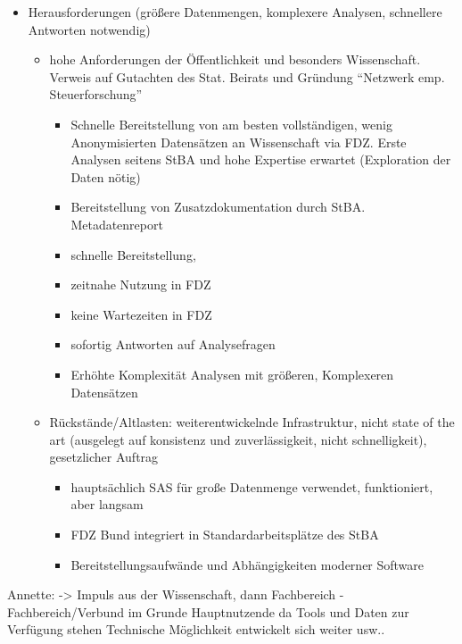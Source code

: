 \documentclass[
  german,
  10pt,
  twoside]{article}
\providecommand{\tightlist}{%
  \setlength{\itemsep}{0pt}\setlength{\parskip}{0pt}}
\begin{document}
\begin{itemize}
\item
  Herausforderungen (größere Datenmengen, komplexere Analysen,
  schnellere Antworten notwendig)

  \begin{itemize}
  \tightlist
  \item
    hohe Anforderungen der Öffentlichkeit und besonders Wissenschaft.
    Verweis auf Gutachten des Stat. Beirats und Gründung ``Netzwerk emp.
    Steuerforschung''

    \begin{itemize}
    \tightlist
    \item
      Schnelle Bereitstellung von am besten vollständigen, wenig
      Anonymisierten Datensätzen an Wissenschaft via FDZ. Erste Analysen
      seitens StBA und hohe Expertise erwartet (Exploration der Daten
      nötig)
    \item
      Bereitstellung von Zusatzdokumentation durch StBA. Metadatenreport
    \item
      schnelle Bereitstellung,
    \item
      zeitnahe Nutzung in FDZ
    \item
      keine Wartezeiten in FDZ
    \item
      sofortig Antworten auf Analysefragen
    \item
      Erhöhte Komplexität Analysen mit größeren, Komplexeren Datensätzen
    \end{itemize}
  \item
    Rückstände/Altlasten: weiterentwickelnde Infrastruktur, nicht state
    of the art (ausgelegt auf konsistenz und zuverlässigkeit, nicht
    schnelligkeit), gesetzlicher Auftrag

    \begin{itemize}
    \tightlist
    \item
      hauptsächlich SAS für große Datenmenge verwendet, funktioniert,
      aber langsam
    \item
      FDZ Bund integriert in Standardarbeitsplätze des StBA
    \item
      Bereitstellungsaufwände und Abhängigkeiten moderner Software
    \end{itemize}
  \end{itemize}
\end{itemize}

Annette: -\textgreater{} Impuls aus der Wissenschaft, dann Fachbereich -
Fachbereich/Verbund im Grunde Hauptnutzende da Tools und Daten zur
Verfügung stehen Technische Möglichkeit entwickelt sich weiter usw..
\end{document}
